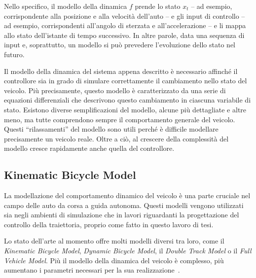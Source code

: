 Nello specifico, il modello della dinamica $f$ prende lo stato
$x_t$ -- ad esempio, corrispondente alla posizione e alla velocità dell'auto -- e gli input di controllo -- ad esempio, corrispondenti all'angolo di sterzata e all'accelerazione -- e li mappa 
allo stato dell'istante di tempo successivo. 
In altre parole, data una sequenza di input e, soprattutto, un modello
si può prevedere l'evoluzione dello stato nel futuro.

Il modello della dinamica del sistema appena descritto è necessario affinché il controllore 
sia in grado di simulare correttamente il cambiamento nello stato del veicolo.
Più precisamente, questo modello è caratterizzato da una serie di equazioni differenziali che descrivono 
questo cambiamento in ciascuna variabile di stato. Esistono diverse semplificazioni del modello, 
alcune più dettagliate e altre meno, ma tutte comprendono sempre il comportamento generale del veicolo.
Questi ``rilassamenti'' del modello sono utili perché è difficile modellare precisamente un veicolo
reale. Oltre a ciò, al crescere della complessità del modello cresce rapidamente anche quella del controllore.

\subsection{Kinematic Bicycle Model}
\label{subs:kinmodel}
La modellazione del comportamento dinamico del veicolo è una parte cruciale nel campo delle auto da corsa a guida autonoma.
Questi modelli vengono utilizzati sia negli ambienti di simulazione che in lavori riguardanti la
progettazione del controllo della traiettoria, proprio come fatto in questo lavoro di tesi.

Lo stato dell'arte al momento offre molti modelli diversi tra loro, 
come il \textit{Kinematic Bicycle Model}, \textit{Dynamic Bicycle 
Model}, il \textit{Double Track Model} o il \textit{Full Vehicle 
Model}. Più il modello della dinamica del veicolo è complesso, più aumentano i parametri necessari per la sua realizzazione~\cite{Betz2022}.

